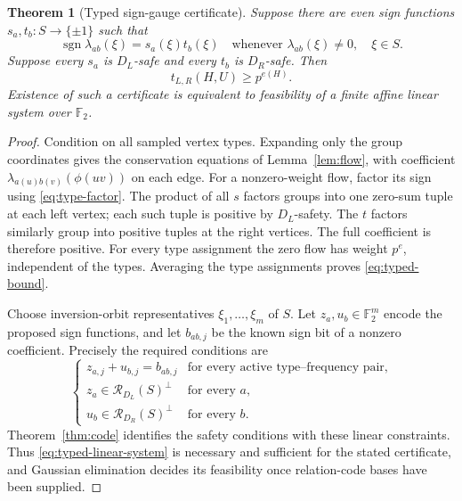 \documentclass[11pt]{article}
\numberwithin{equation}{section}
\newtheorem{theorem}{Theorem}[section]
\theoremstyle{definition}
\theoremstyle{remark}
\newcommand{\F}{\mathbb F}
\newcommand{\sgn}{\operatorname{sgn}}
\newcommand{\Rel}{\mathcal R}
\begin{document}
\begin{theorem}[Typed sign-gauge certificate]
\label{thm:typed}
Suppose there are even sign functions
$s_a,t_b:S\to\{\pm1\}$ such that
\begin{equation}
 \sgn\lambda_{ab}(\xi)=s_a(\xi)t_b(\xi)
 \quad\text{whenever }\lambda_{ab}(\xi)\ne0,\quad\xi\in S.
 \label{eq:type-factor}
\end{equation}
Suppose every $s_a$ is $D_L$-safe and every $t_b$ is $D_R$-safe. Then
\begin{equation}
 t_{L,R}(H,U)\geq p^{e(H)}.
 \label{eq:typed-bound}
\end{equation}
Existence of such a certificate is equivalent to feasibility of a finite
affine linear system over $\F_2$.
\end{theorem}
\begin{proof}
Condition on all sampled vertex types. Expanding only the group
coordinates gives the conservation equations of Lemma~\ref{lem:flow},
with coefficient $\lambda_{a(u)b(v)}(\phi(uv))$ on each edge. For a
nonzero-weight flow, factor its sign using \eqref{eq:type-factor}.
The product of all $s$ factors groups into one zero-sum tuple at each
left vertex; each such tuple is positive by $D_L$-safety. The $t$
factors similarly group into positive tuples at the right vertices.
The full coefficient is therefore positive. For every type assignment
the zero flow has weight $p^e$, independent of the types. Averaging the
type assignments proves \eqref{eq:typed-bound}.

Choose inversion-orbit representatives $\xi_1,\ldots,\xi_m$ of $S$.
Let $z_a,u_b\in\F_2^m$ encode the proposed sign functions, and let
$b_{ab,j}$ be the known sign bit of a nonzero coefficient. Precisely the
required conditions are
\begin{equation}
 \begin{cases}
   z_{a,j}+u_{b,j}=b_{ab,j}
         &\text{for every active type--frequency pair},\\
   z_a\in\Rel_{D_L}(S)^\perp &\text{for every }a,\\
   u_b\in\Rel_{D_R}(S)^\perp &\text{for every }b.
 \end{cases}
 \label{eq:typed-linear-system}
\end{equation}
Theorem~\ref{thm:code} identifies the safety conditions with these
linear constraints. Thus \eqref{eq:typed-linear-system} is necessary and
sufficient for the stated certificate, and Gaussian elimination decides
its feasibility once relation-code bases have been supplied.
\end{proof}
\end{document}

